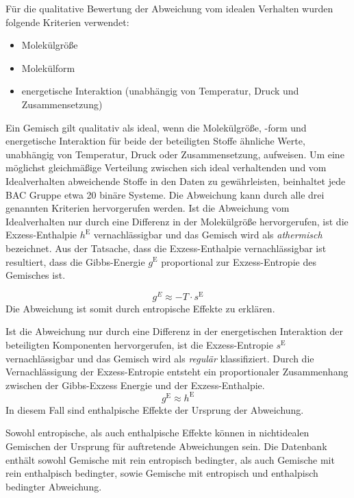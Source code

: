 \documentclass[../thesis.tex]{subfiles}
\begin{document}
Für die qualitative Bewertung der Abweichung vom idealen Verhalten wurden folgende Kriterien verwendet:
\begin{itemize}
	\item Molekülgröße
	\item Molekülform
	\item energetische Interaktion (unabhängig von Temperatur, Druck und Zusammensetzung)
\end{itemize}
Ein Gemisch gilt qualitativ als ideal, wenn die Molekülgröße, -form und energetische Interaktion für beide der beteiligten Stoffe ähnliche Werte, unabhängig von Temperatur, Druck oder Zusammensetzung, aufweisen.
Um eine möglichst gleichmäßige Verteilung zwischen sich ideal verhaltenden und vom Idealverhalten abweichende Stoffe in den Daten zu gewährleisten, beinhaltet jede BAC Gruppe etwa 20 binäre Systeme.
Die Abweichung kann durch alle drei genannten Kriterien hervorgerufen werden. Ist die Abweichung vom Idealverhalten nur durch eine Differenz in der Molekülgröße hervorgerufen, ist die Exzess-Enthalpie $h^{\mathrm{E}}$ vernachlässigbar und das Gemisch wird als \textit{athermisch} bezeichnet. Aus der Tatsache, dass die Exzess-Enthalpie vernachlässigbar ist resultiert, dass die Gibbs-Energie $g^{\mathrm{E}}$ proportional zur Exzess-Entropie des Gemisches ist.

\begin{equation}
	g^E \approx - T \cdot s^{\mathrm{E}}
\end{equation}   
Die Abweichung ist somit durch entropische Effekte zu erklären.

Ist die Abweichung nur durch eine Differenz in der energetischen Interaktion der beteiligten Komponenten hervorgerufen, ist die Exzess-Entropie $s^{\mathrm{E}}$ vernachlässigbar und das Gemisch wird als \textit{regulär} klassifiziert. Durch die Vernachlässigung der Exzess-Entropie entsteht ein proportionaler Zusammenhang zwischen der Gibbs-Exzess Energie und der Exzess-Enthalpie.
\begin{equation}
	g^{\mathrm{E}} \approx h^{\mathrm{E}}
\end{equation}
In diesem Fall sind enthalpische Effekte der Ursprung der Abweichung.

Sowohl entropische, als auch enthalpische Effekte können in nichtidealen Gemischen der Ursprung für auftretende Abweichungen sein. Die Datenbank enthält sowohl Gemische mit rein entropisch bedingter, als auch Gemische mit rein enthalpisch bedingter, sowie Gemische mit entropisch und enthalpisch bedingter Abweichung.
\end{document}
